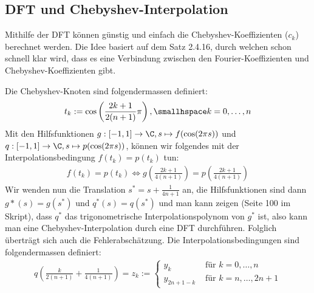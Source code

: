 
\newsection
\subsection{DFT und Chebyshev-Interpolation}
Mithilfe der DFT können günstig und einfach die Chebyshev-Koeffizienten ($c_k$) berechnet werden.
Die Idee basiert auf dem Satz 2.4.16, durch welchen schon schnell klar wird, dass es eine Verbindung zwischen den Fourier-Koeffizienten und Chebyshev-Koeffizienten gibt.

Die Chebyshev-Knoten sind folgendermassen definiert:
\begin{align*}
    t_k := \cos\left( \frac{2k + 1}{2(n + 1)} \pi \right), \smallhspace k = 0, \ldots, n
\end{align*}
Mit den Hilfsfunktionen $g: [-1, 1] \rightarrow \C, s \mapsto f(\cos(2\pi s))$ und $q: [-1, 1] \rightarrow \C, s \mapsto p(\cos(2\pi s))$,
können wir folgendes mit der Interpolationsbedingung $f(t_k) = p(t_k)$ tun:
\begin{align*}
    f(t_k) = p(t_k) \Longleftrightarrow g\left( \frac{2k + 1}{4(n + 1)} \right) = p\left( \frac{2k + 1}{4(n + 1)} \right)
\end{align*}
Wir wenden nun die Translation $s^* = s + \frac{1}{4n + 1}$ an, die Hilfsfunktionen sind dann $g*(s) = g(s^*)$ und $q^*(s) = q(s^*)$
und man kann zeigen (Seite 100 im Skript), dass $q^*$ das trigonometrische Interpolationspolynom von $g^*$ ist,
also kann man eine Chebyshev-Interpolation durch eine DFT durchführen.
Folglich überträgt sich auch die Fehlerabschätzung. Die Interpolationsbedingungen sind folgendermassen definiert:
\begin{align*}
    q\left( \frac{k}{2(n + 1)} + \frac{1}{4(n + 1)} \right) = z_k :=
    \begin{cases}
        y_k            & \text{ für } k = 0, \ldots, n \\
        y_{2n + 1 - k} & \text{ für } k = n, \ldots, 2n + 1
    \end{cases}
\end{align*}

